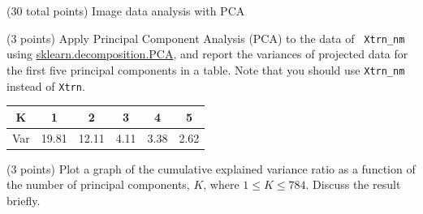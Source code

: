 \documentclass[12pt]{article}
\begin{document}
\begin{question}{(30 total points) Image data analysis with PCA}
   \begin{subquestion}{(3 points)
       Apply Principal Component Analysis (PCA) to the data of {\tt
         Xtrn\_nm} using
       \href{https://scikit-learn.org/0.19/modules/generated/sklearn.decomposition.PCA.html}{sklearn.decomposition.PCA},
       and report the variances of projected data for the first five principal
       components in a table. 
       Note that you should use {\tt Xtrn\_nm} instead of {\tt Xtrn}.
           } \label{Q1.pca.variance}



    \begin{answerbox}{15em}
    \begin{center}
    \begin{tabular}{|c|c|c|c|c|c|}
    \hline 
    K & 1 & 2 & 3 & 4 & 5 \\
    \hline 
    Var & 19.81& 12.11& 4.11& 3.38& 2.62 \\ 
    \hline 
    \end{tabular} 
    \end{center}
    \end{answerbox}
    


   \end{subquestion}

   \begin{subquestion}{(3 points)
       Plot a graph of the cumulative explained variance ratio as a
       function of the number of principal components, $K$, where $1
       \le K \le 784$.
       Discuss the result briefly.
     } \label{Q1.plot.pca.variance}
   


\end{subquestion}
\end{question}
\end{document}
